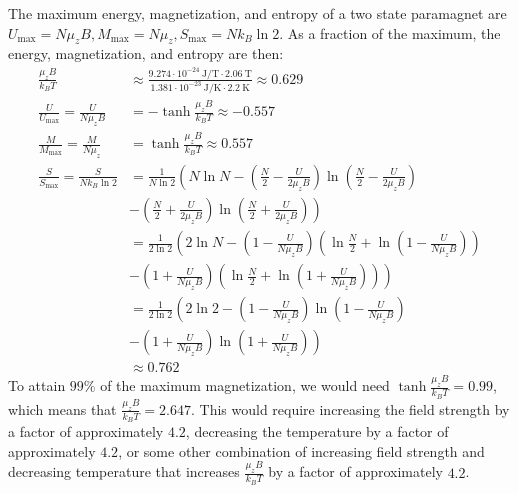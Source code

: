 \documentclass{article}
\begin{document}
\clearpage

The maximum energy, magnetization, and entropy of a two state paramagnet are $U_{\text{max}} = N\mu_z B, M_{\text{max}} = N\mu_z, S_{\text{max}} = Nk_B\ln 2$. As a fraction of the maximum, the energy, magnetization, and entropy are then:
\begin{equation}
    \begin{split}
        \frac{\mu_z B}{k_B T} & \approx \frac{9.274 \cdot 10^{-24}~\unit{\joule\per\tesla} \cdot 2.06~\unit{\tesla}}{1.381 \cdot 10^{-23}~\unit{\joule\per\kelvin} \cdot 2.2~\unit{\kelvin}} \approx 0.629 \\
        \frac{U}{U_{\text{max}}} = \frac{U}{N\mu_z B} & = -\tanh\frac{\mu_z B}{k_B T} \approx -0.557 \\
        \frac{M}{M_{\text{max}}} = \frac{M}{N\mu_z} & = \tanh\frac{\mu_z B}{k_B T} \approx 0.557 \\
        \frac{S}{S_{\text{max}}} = \frac{S}{Nk_B\ln 2} & = \frac{1}{N\ln 2}\left(N\ln N - \left(\frac{N}{2} - \frac{U}{2\mu_z B}\right)\ln \left(\frac{N}{2} - \frac{U}{2\mu_z B}\right)\right. \\
        & \left.- \left(\frac{N}{2} + \frac{U}{2\mu_z B}\right)\ln \left(\frac{N}{2} + \frac{U}{2\mu_z B}\right)\right) \\
        & = \frac{1}{2\ln 2}\left(2\ln N - \left(1 - \frac{U}{N\mu_z B}\right)\left(\ln\frac{N}{2} + \ln \left(1 - \frac{U}{N\mu_z B}\right)\right)\right. \\
        & \left.- \left(1 + \frac{U}{N\mu_z B}\right)\left(\ln\frac{N}{2} + \ln \left(1 + \frac{U}{N\mu_z B}\right)\right)\right) \\
        & = \frac{1}{2\ln 2}\left(2\ln 2 - \left(1 - \frac{U}{N\mu_z B}\right)\ln \left(1 - \frac{U}{N\mu_z B}\right)\right. \\
        & \left.- \left(1 + \frac{U}{N\mu_z B}\right)\ln \left(1 + \frac{U}{N\mu_z B}\right)\right) \\
        & \approx 0.762
    \end{split}
\end{equation}
To attain $99\%$ of the maximum magnetization, we would need $\tanh\frac{\mu_z B}{k_B T} = 0.99$, which means that $\frac{\mu_z B}{k_B T} = 2.647$. This would require increasing the field strength by a factor of approximately $4.2$, decreasing the temperature by a factor of approximately $4.2$, or some other combination of increasing field strength and decreasing temperature that increases $\frac{\mu_z B}{k_B T}$ by a factor of approximately $4.2$.
\end{document}
